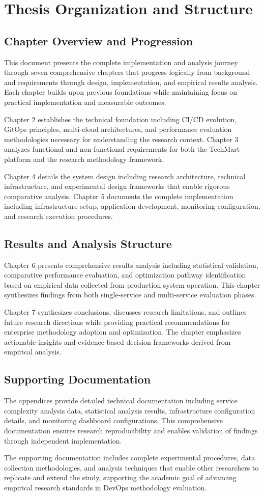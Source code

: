 \section{Thesis Organization and Structure}

\subsection{Chapter Overview and Progression}
This document presents the complete implementation and analysis journey through seven comprehensive chapters that progress logically from background and requirements through design, implementation, and empirical results analysis. Each chapter builds upon previous foundations while maintaining focus on practical implementation and measurable outcomes.

Chapter 2 establishes the technical foundation including CI/CD evolution, GitOps principles, multi-cloud architectures, and performance evaluation methodologies necessary for understanding the research context. Chapter 3 analyzes functional and non-functional requirements for both the TechMart platform and the research methodology framework.

Chapter 4 details the system design including research architecture, technical infrastructure, and experimental design frameworks that enable rigorous comparative analysis. Chapter 5 documents the complete implementation including infrastructure setup, application development, monitoring configuration, and research execution procedures.

\subsection{Results and Analysis Structure}
Chapter 6 presents comprehensive results analysis including statistical validation, comparative performance evaluation, and optimization pathway identification based on empirical data collected from production system operation. This chapter synthesizes findings from both single-service and multi-service evaluation phases.

Chapter 7 synthesizes conclusions, discusses research limitations, and outlines future research directions while providing practical recommendations for enterprise methodology adoption and optimization. The chapter emphasizes actionable insights and evidence-based decision frameworks derived from empirical analysis.

\subsection{Supporting Documentation}
The appendices provide detailed technical documentation including service complexity analysis data, statistical analysis results, infrastructure configuration details, and monitoring dashboard configurations. This comprehensive documentation ensures research reproducibility and enables validation of findings through independent implementation.

The supporting documentation includes complete experimental procedures, data collection methodologies, and analysis techniques that enable other researchers to replicate and extend the study, supporting the academic goal of advancing empirical research standards in DevOps methodology evaluation.